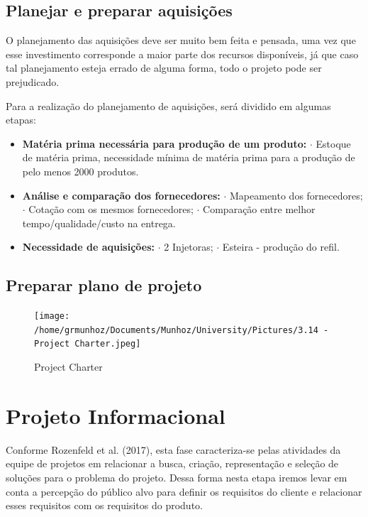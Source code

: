 \documentclass[
	12pt,				%
	openright,			%
	oneside,			%
	a4paper,			%
	english,			%
	french,				%
	spanish,			%
	brazil				%
	]{abntex2}
\begin{document}
\section{Planejar e preparar aquisições}

O planejamento das aquisições deve ser muito bem feita e pensada, uma vez que esse investimento corresponde a maior parte dos recursos disponíveis, já que caso tal planejamento esteja errado de alguma forma, todo o projeto pode ser prejudicado.

Para a realização do planejamento de aquisições, será dividido em algumas etapas:

\begin{itemize}
\item \textbf{Matéria prima necessária para produção de um produto:}
	\subitem $\cdot$ Estoque de matéria prima, necessidade mínima de matéria prima para a produção de pelo menos 2000 produtos.
\item \textbf{Análise e comparação dos fornecedores:}
	\subitem $\cdot$ Mapeamento dos fornecedores;
	\subitem $\cdot$ Cotação com os mesmos fornecedores;
	\subitem $\cdot$ Comparação entre melhor tempo/qualidade/custo na entrega.
\item \textbf{Necessidade de aquisições:}
	\subitem $\cdot$ 2 Injetoras;
	\subitem $\cdot$ Esteira - produção do refil.
\end{itemize}
\section{Preparar plano de projeto}

\begin{figure}[H]
\begin{center}
\caption{Project Charter}
\texttt{[image: /home/grmunhoz/Documents/Munhoz/University/Pictures/3.14 - Project Charter.jpeg]} 
\label{figprojeto}
\end{center}
\end{figure}

\newpage
\chapter{Projeto Informacional}

Conforme Rozenfeld et al. (2017), esta fase caracteriza-se pelas atividades da equipe de projetos em relacionar a busca, criação, representação e seleção de soluções para o problema do projeto. Dessa forma nesta etapa iremos levar em conta a percepção do público alvo para definir os requisitos do cliente e relacionar esses requisitos com os requisitos do produto. \cite{rozenfeld}
\end{document}
